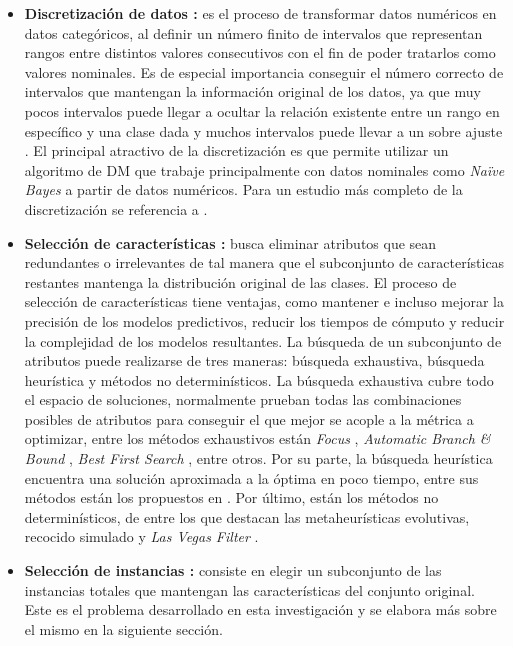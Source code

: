 \begin{itemize}
\item \textbf{Discretización de datos \cite{garcia2016data,garcia2013survey}:}
es el proceso de transformar datos numéricos en datos categóricos, al definir un número finito de intervalos que representan rangos entre distintos valores consecutivos con el fin de poder tratarlos como valores nominales. Es de especial importancia conseguir el número correcto de intervalos que mantengan la información original de los datos, ya que muy pocos intervalos puede llegar a ocultar la relación existente entre un rango en específico y una clase dada y muchos intervalos puede llevar a un sobre ajuste \cite{cios2007data}. El principal atractivo de la discretización es que permite utilizar un algoritmo de DM que trabaje principalmente con datos nominales como \emph{Naïve Bayes} \cite{yang2009discretization} a partir de datos numéricos. Para un estudio más completo de la discretización se referencia a \cite{garcia2013survey}.

\item \textbf{Selección de características \cite{garcia2016data,liu2012feature}:}
busca eliminar atributos que sean redundantes o irrelevantes de tal manera que el subconjunto de características restantes mantenga la distribución original de las clases. El proceso de selección de características tiene ventajas, como mantener e incluso mejorar la precisión de los modelos predictivos, reducir los tiempos de cómputo y reducir la complejidad de los modelos resultantes. La búsqueda de un subconjunto de atributos puede realizarse de tres maneras: búsqueda exhaustiva, búsqueda heurística y métodos no determinísticos. La búsqueda exhaustiva cubre todo el espacio de soluciones, normalmente prueban todas las combinaciones posibles de atributos para conseguir el que mejor se acople a la métrica a optimizar, entre los métodos exhaustivos están \emph{Focus} \cite{almuallim1991learning}, \emph{Automatic Branch \& Bound} \cite{liul1998monotonic}, \emph{Best First Search} \cite{xu1988best}, entre otros. Por su parte, la búsqueda heurística encuentra una solución aproximada a la óptima en poco tiempo, entre sus métodos están los propuestos en \cite{dash1997feature,koller1996toward,battiti1994using}. Por último, están los métodos no determinísticos, de entre los que destacan las metaheurísticas evolutivas, recocido simulado y \emph{Las Vegas Filter} \cite{liu1996probabilistic}.

\item \textbf{Selección de instancias \cite{garcia2016data}:}
consiste en elegir un subconjunto de las instancias totales que mantengan las características del conjunto original. Este es el problema desarrollado en esta investigación y se elabora más sobre el mismo en la siguiente sección.
\end{itemize}

